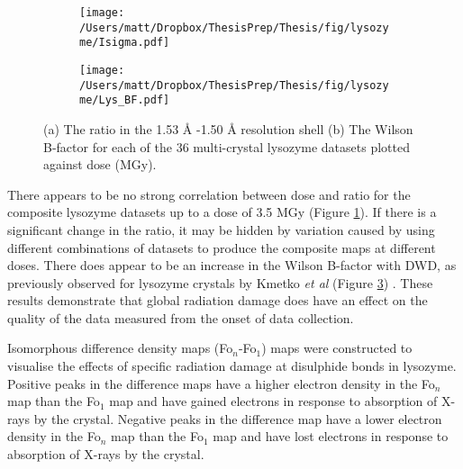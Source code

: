 \begin{figure}[!htbp]
\centering
\begin{subfigure}{.5\textwidth}
  \centering
  \texttt{[image: /Users/matt/Dropbox/ThesisPrep/Thesis/fig/lysozyme/Isigma.pdf]}
  \caption{}
  \label{fig:LysIsigI}
\end{subfigure}%
\begin{subfigure}{.5\textwidth}
  \centering
  \texttt{[image: /Users/matt/Dropbox/ThesisPrep/Thesis/fig/lysozyme/Lys\_BF.pdf]}
  \caption{}
  \label{fig:Lys_BF}
\end{subfigure}
\caption[Indicators of Global Radiation Damage to Lysozyme Crystals]{(a) The  ratio in the 1.53 \si{\angstrom} -1.50 \si{\angstrom} resolution shell (b) The Wilson B-factor for each of the 36 multi-crystal lysozyme datasets plotted against dose (\si{\mega\gray}).}
\end{figure}

There appears to be no strong correlation between dose and  ratio for the composite lysozyme datasets up to a dose of 3.5 \si{\mega\gray} (Figure \ref{fig:LysIsigI}). If there is a significant change in the  ratio, it may be hidden by variation caused by using different combinations of datasets to produce the composite maps at different doses. There does appear to be an increase in the Wilson B-factor with DWD, as previously observed for lysozyme crystals by Kmetko \textit{et al} (Figure \ref{fig:Lys_BF}) \cite{Kmetko2006}. These results demonstrate that global radiation damage does have an effect on the quality of the data measured from the onset of data collection.   

Isomorphous difference density maps (Fo$_n$-Fo$_1$) maps were constructed to visualise the effects of specific radiation damage at disulphide bonds in lysozyme. Positive peaks in the difference maps have a higher electron density in the Fo$_n$ map than the Fo$_1$ map and have gained electrons in response to absorption of X-rays by the crystal. Negative peaks in the difference map have a lower electron density in the Fo$_n$ map than the Fo$_1$ map and have lost electrons in response to absorption of X-rays by the crystal.      

